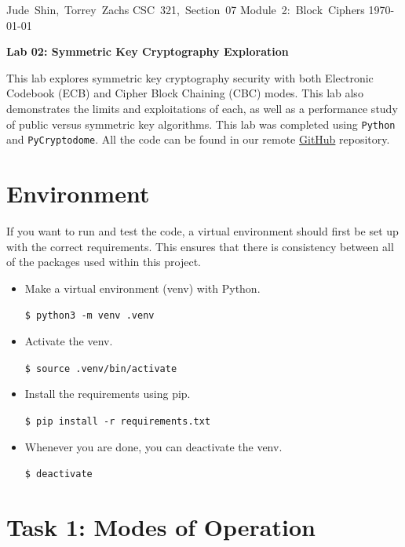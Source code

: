 \documentclass[11pt]{article}
\begin{document}
\hfill\vbox{\hbox{Jude Shin, Torrey Zachs}
		\hbox{CSC 321, Section 07}	
		\hbox{Module 2: Block Ciphers}	
		\hbox{\today}}\par

\bigskip
\centerline{\Large\bf Lab 02: Symmetric Key Cryptography Exploration}\par
\bigskip

This lab explores symmetric key cryptography security with both Electronic Codebook (ECB) and Cipher Block Chaining (CBC) modes. This lab also demonstrates the limits and exploitations of each, as well as a performance study of public versus symmetric key algorithms. This lab was completed using {\tt Python} and {\tt PyCryptodome}. All the code can be found in our remote \href{https://github.com/jude-shin/CSC\_321}{GitHub} repository.

\section*{Environment}

If you want to run and test the code, a virtual environment should first be set up with the correct requirements. This ensures that there is consistency between all of the packages used within this project.

\begin{itemize}
	\item Make a virtual environment (venv) with Python.

		\verb|$ python3 -m venv .venv|

	\item Activate the venv.

		\verb|$ source .venv/bin/activate|

	\item Install the requirements using pip.

		\verb|$ pip install -r requirements.txt|

	\item Whenever you are done, you can deactivate the venv.

		\verb|$ deactivate|

\end{itemize}

\section*{Task 1: Modes of Operation}
\end{document}
